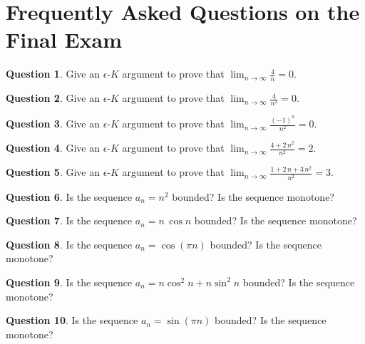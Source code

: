 \documentclass[12pt]{article}
\theoremstyle{definition}
\newtheorem{question}{Question}
\newcommand{\limn}{\displaystyle\lim_{n \to \infty}}
\begin{document}
\pagebreak

\section*{Frequently Asked Questions on the Final Exam}

\begin{question}
Give an $\epsilon$-$K$ argument to prove that $\limn \displaystyle\frac{4}{n} = 0$.
\end{question}

\begin{question}
Give an $\epsilon$-$K$ argument to prove that $\limn \displaystyle\frac{4}{n^2} = 0$.
\end{question}

\begin{question}
Give an $\epsilon$-$K$ argument to prove that $\limn \displaystyle\frac{(-1)^n}{n^2} = 0$.
\end{question}

\begin{question}
Give an $\epsilon$-$K$ argument to prove that $\limn \displaystyle\frac{4 + 2\,n^2}{n^2} = 2$.
\end{question}

\begin{question}
Give an $\epsilon$-$K$ argument to prove that $\limn \displaystyle\frac{1 + 2\,n + 3\,n^2}{n^2} = 3$.
\end{question}

\begin{question}
Is the sequence $a_n = n^2$ bounded?  Is the sequence monotone?
\end{question}

\begin{question}
Is the sequence $a_n = n \, \cos n$ bounded?  Is the sequence monotone?
\end{question}

\begin{question}
Is the sequence $a_n = \cos (\pi n)$ bounded?  Is the sequence monotone?
\end{question}

\begin{question}
Is the sequence $a_n = n \cos^2 n + n \sin^2 n$ bounded?  Is the sequence monotone?
\end{question}

\begin{question}
Is the sequence $a_n = \sin (\pi n)$ bounded?  Is the sequence monotone?
\end{question}
\end{document}
